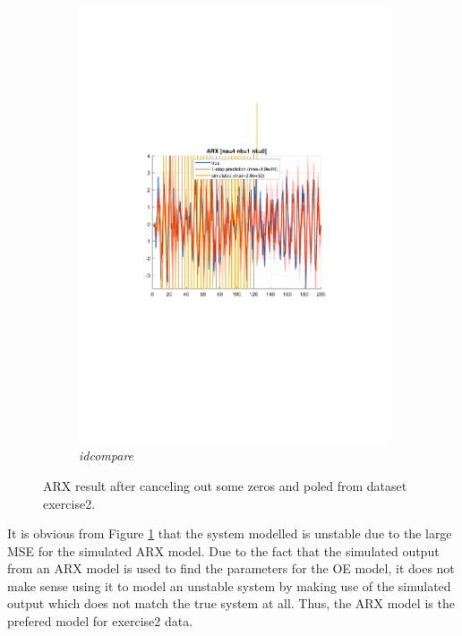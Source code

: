 \documentclass[]{article}
\begin{document}
\begin{figure}[ht]
\begin{subfigure}{.49\textwidth}
	\includegraphics[trim= 10cm 8cm 10cm 8cm, scale=0.4]{figures/3-ARX-Ex2-idcompare-cancel_out.pdf}
	\caption{\emph{idcompare}}
\end{subfigure}
\caption{ARX result after canceling out some zeros and poled from dataset exercise2.}
\label{fig:Ex2-ARX-cancel}
\end{figure}

It is obvious from Figure \ref{fig:Ex2-ARX-cancel} that the system modelled is unstable due to the large MSE for the simulated ARX model. Due to the fact that the simulated output from an ARX model is used to find the parameters for the OE model, it does not make sense using it to model an unstable system by making use of the simulated output which does not match the true system at all. Thus, the ARX model is the prefered model for exercise2 data.
\end{document}
